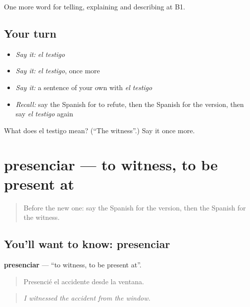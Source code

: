 \begin{grammarlens}[title={What you've built}]
One more word for telling, explaining and describing at B1.
\end{grammarlens}

\subsection*{Your turn}
\begin{itemize}
\raggedright
  \item \emph{Say it:} \emph{el testigo}
  \item \emph{Say it:} \emph{el testigo}, once more
  \item \emph{Say it:} a sentence of your own with \emph{el testigo}
  \item \emph{Recall:} say the Spanish for to refute, then the Spanish for the version, then say \emph{el testigo} again
\end{itemize}

\begin{tcolorbox}[breakable,colback=teal!4,colframe=teal!35!black,title={Before you move on}]
What does el testigo mean? (\textquotedblleft{}The witness\textquotedblright{}.) Say it once more.
\end{tcolorbox}
\section[presenciar]{presenciar — to witness, to be present at}

\label{lesson:ES-C517-presenciar}



\begin{quote}
Before the new one: say the Spanish for the version, then the Spanish for the witness.
\end{quote}

\subsection*{You'll want to know: presenciar}
\textbf{presenciar} — \textquotedblleft{}to witness, to be present at\textquotedblright{}.

\begin{quote}
Presencié el accidente desde la ventana.
\end{quote}

\begin{quote}
\emph{I witnessed the accident from the window.}
\end{quote}

